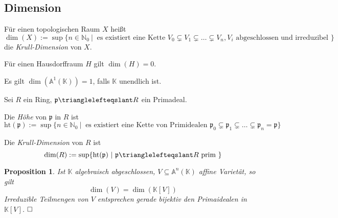 \documentclass[11pt]{book}
\newtheorem{prop}[theorem]{Proposition}
\theoremstyle{nonumberbreak}
\newenvironment{defin}[1][]{\ifthenelse{\equal{#1}{}}{\definition}{\definition[#1]}\rm}{\enddefinition}
\newenvironment{pr}[1][]{\ifthenelse{\equal{#1}{}}{\proof}{\proof[#1]}\rm}{\endproof}
\newenvironment{ex}[1][]{\ifthenelse{\equal{#1}{}}{\example}{\example[#1]}\rm}{\endexample}
\newenvironment{er}[1][]{\ifthenelse{\equal{#1}{}}{\erinner}{\erinner[#1]}\rm}{\enderinner}
\begin{document}
\begin{spacing}{1.3}
\renewcommand*\thesection{§ \arabic{section}\quad}
\section{Dimension} %
\renewcommand*\thesection{\arabic{section}}

\begin{defin} %

Für einen topologischen Raum $X$ heißt
$$ \dim(X) := \sup \{ n \in \mathbb{N}_0 \ \vert \ \textrm{ es existiert eine Kette } V_0 \subsetneq V_1 \subsetneq \ldots \subsetneq V_n, V_i \textrm{ abgeschlossen und irreduzibel } \}$$
die \textit{Krull-Dimension} von $X$.
\end{defin}


\begin{ex}

\begin{compactenum}
\item Für einen Hausdorffraum $H$ gilt $\dim(H) = 0$.
\item Es gilt $\dim(\mathbb{A}^1(\mathbb{K})) = 1$, falls $\mathbb{K}$ unendlich ist.
\end{compactenum}
\end{ex}

\begin{er} %

Sei $R$ ein Ring, $\mathfrak{p} \trianglelefteqslant R$ ein Primadeal.
\begin{compactenum}
\item Die \textit{Höhe} von $\mathfrak{p}$ in $R$ ist
$$\textrm{ht}(\mathfrak{p}) := \sup \{ n \in \mathbb{N}_0 \ \vert \ \textrm{ es existiert eine Kette von Primidealen } \mathfrak{p_0} \subsetneq \mathfrak{p}_1 \subsetneq \ldots \subsetneq \mathfrak{p}_n = \mathfrak{p} \}$$
\item Die \textit{Krull-Dimension} von $R$ ist
$$\dim(R) := \sup \{ \textrm{ht}(\mathfrak{p}) \ \vert \ \mathfrak{p} \trianglelefteqslant R \textrm{ prim } \}$$
\end{compactenum}
\end{er}

\begin{prop} %

Ist $\mathbb{K}$ algebraisch abgeschlossen, $V \subseteq \mathbb{A}^n(\mathbb{K})$ affine Varietät, so gilt
$$\dim(V) = \dim( \mathbb{K}[V] )$$
\begin{pr}
Irreduzible Teilmengen von $V$ entsprechen gerade bijektiv den Primaidealen in $\mathbb{K}[V]$. $\hfill \Box$
\end{pr}
\end{prop}


\end{spacing}
\end{document}
